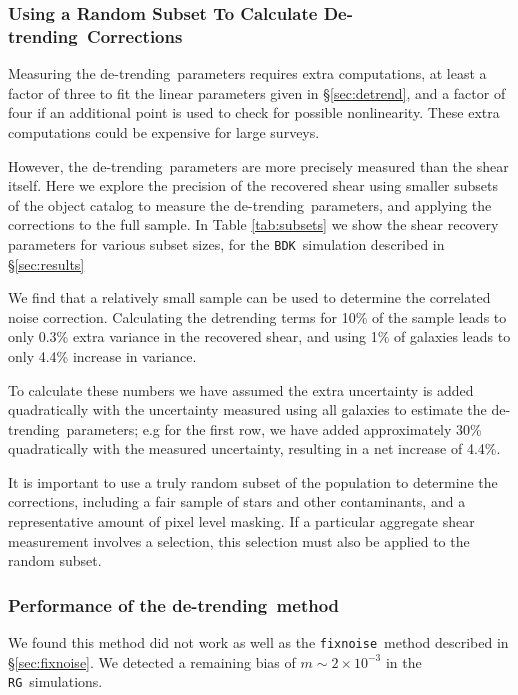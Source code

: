 \documentclass[iop]{emulateapj}
\newcommand{\detrend}{de-trending}
\newcommand{\Detrend}{De-trending}
\newcommand{\fixnoise}{\texttt{fixnoise}}
\newcommand{\bdksim}{\texttt{BDK}}
\newcommand{\rgsim}{\texttt{RG}}
\begin{document}
\subsubsection{Using a Random Subset To Calculate \Detrend\ Corrections}

Measuring the \detrend\ parameters requires extra computations, at least a
factor of three to fit the linear parameters given in \S \ref{sec:detrend}, and
a factor of four if an additional point is used to check for possible
nonlinearity. These extra computations could be expensive for large surveys.  

However, the \detrend\ parameters are more precisely measured than the shear
itself.  Here we explore the precision of the recovered shear using smaller
subsets of the object catalog to measure the \detrend\ parameters, and
applying the corrections to the full sample.  In Table \ref{tab:subsets}
we show the shear recovery parameters for various subset sizes, for the
\bdksim\ simulation described in \S \ref{sec:results}



We find that a relatively small sample can be used to determine the correlated
noise correction.  Calculating the detrending terms for 10\% of the sample
leads to only 0.3\% extra variance in the recovered shear, and using 1\% of
galaxies leads to only 4.4\% increase in variance.

To calculate these numbers we have assumed the extra uncertainty is added
quadratically with the uncertainty measured using all galaxies to estimate the
\detrend\ parameters; e.g for the first row, we have added approximately 30\%
quadratically with the measured uncertainty, resulting in a net increase of
4.4\%.

It is important to use a truly random subset of the population to determine the
corrections, including a fair sample of stars and other contaminants, and a
representative amount of pixel level masking.  If a particular aggregate shear
measurement involves a selection, this selection must also be applied to the
random subset.

\subsubsection{Performance of the \detrend\ method}

We found this method did not work as well as the \fixnoise\ method
described in \S \ref{sec:fixnoise}.  We detected a remaining bias
of $m \sim 2 \times 10^{-3}$ in the \rgsim\ simulations.
\end{document}
